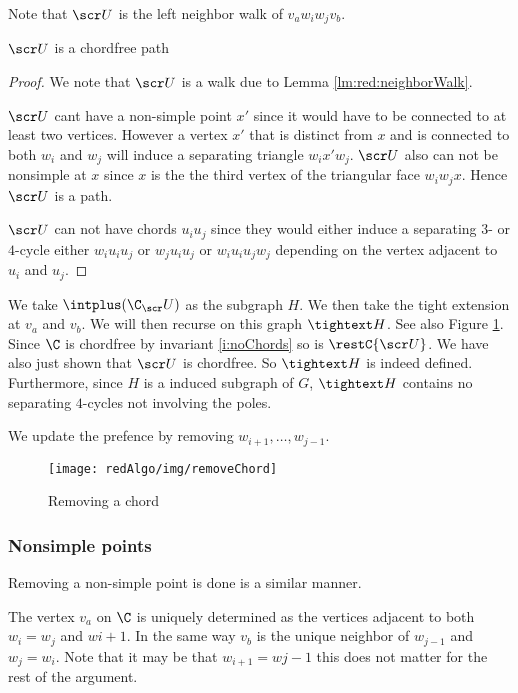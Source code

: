     Note that $\U$ is the left neighbor walk of $v_a w_i w_j v_b$.

    \begin{lemma}
    $\U$ is a chordfree path
    \end{lemma}
    \begin{proof}
    We note that $\U$ is a walk due to Lemma \ref{lm:red:neighborWalk}.

    $\U$ cant have a non-simple point $x'$ since it would have to be connected to at least two vertices. However a vertex $x'$ that is distinct from $x$ and is connected to both $w_i$ and $w_j$ will induce a separating triangle $w_i x' w_j$. $\U$ also can not be nonsimple at $x$ since $x$ is the the third vertex of the triangular face $w_i w_j x$. Hence $\U$ is a path.

    $\scr U$ can not have chords $u_i u_j$ since they would either induce a separating $3$- or $4$-cycle either $w_i u_i u_j$ or $w_j u_i u_j$ or $w_i u_i u_j w_j$ depending on the vertex adjacent to $u_i$ and $u_j$.
    \end{proof}


    We take $\intplus(\C_\U)$ as the subgraph $H$. We then take the tight extension at $v_a$ and $v_b$. We will then recurse on this graph $\tightext H$. See also Figure \ref{fig:removeChord}. Since $\C$ is chordfree by invariant \ref{i:noChords} so is $\restC{\U}$. We have also just shown that $\U$ is chordfree. So $\tightext H$ is indeed defined.
    Furthermore, since $H$ is a induced subgraph of $G$, $\tightext H$ contains no separating $4$-cycles not involving the poles.

    We update the prefence by removing $w_{i+1}, \ldots, w_{j-1}$.

    \begin{figure}[h!]
    \centering
    \texttt{[image: redAlgo/img/removeChord]}

    \caption{Removing a chord
        \label{fig:removeChord}}
    \end{figure}

  \subsubsection{Nonsimple points}
    \label{ss:nonsimplePoints}
    Removing a non-simple point is done is a similar manner.

    The vertex $v_a$ on $\C$ is uniquely determined as the vertices adjacent to both $w_i=w_j$ and $w{i+1}$. In the same way $v_b$ is the unique neighbor of $w_{j-1}$ and $w_j=w_i$. Note that it may be that $w_{i+1} = w{j-1}$ this does not matter for the rest of the argument. 

